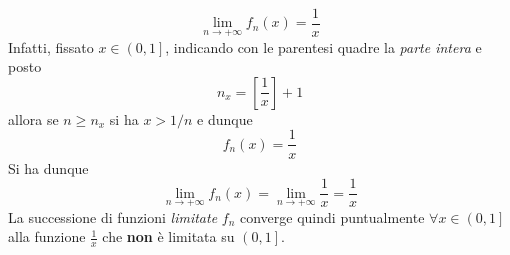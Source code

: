 \begin{example}
	\begin{equation*}
		\lim_{n\to+\infty}f_n\left(x\right)=\frac{1}{x}
	\end{equation*}
	Infatti, fissato $x\in \left(0,1\right]$, indicando con le parentesi quadre la \textit{parte intera} e posto 
	\begin{equation*}
	n_x=\left[\frac{1}{x}\right]+1
	\end{equation*}
	allora se $n\geq n_x$ si ha $x>1/n$ e dunque
	\begin{equation*}
	f_n\left(x\right)=\frac{1}{x}
	\end{equation*}
	Si ha dunque
	\begin{equation*}
		\lim_{n\to+\infty}f_n\left(x\right)=\lim_{n\to+\infty}\frac{1}{x}=\frac{1}{x}
	\end{equation*}
	La successione di funzioni \textit{limitate} $f_n$ converge quindi puntualmente $\forall x\in \left(0,1\right]$ alla funzione $\frac{1}{x}$ che \textbf{non} è limitata su $\left(0,1\right]$.
\end{example}
